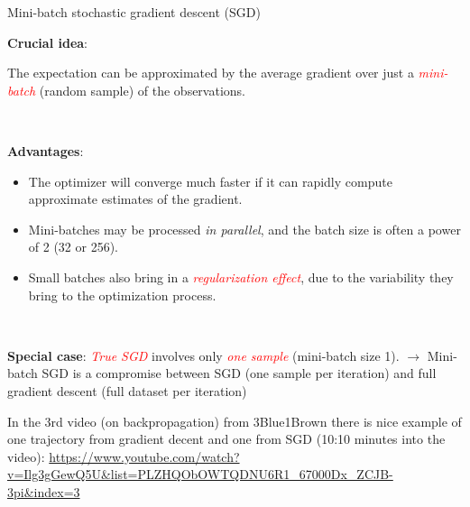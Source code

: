 \documentclass[
  10pt,
  ignorenonframetext,
  twocolumn]{beamer}
\providecommand{\tightlist}{%
  \setlength{\itemsep}{0pt}\setlength{\parskip}{0pt}}
\begin{document}
\begin{frame}
\begin{block}{Mini-batch stochastic gradient descent (SGD)}
\label{mini-batch-stochastic-gradient-descent-sgd}
\(~\)

\textbf{Crucial idea}:

The expectation can be approximated by the average gradient over just a
\emph{\textcolor{red}{mini-batch}} (random sample) of the observations.

\(~\)

\textbf{Advantages}:

\vspace{1mm}

\begin{itemize}
\tightlist
\item
  The optimizer will converge much faster if it can rapidly compute
  approximate estimates of the gradient.
\end{itemize}

\vspace{1mm}

\begin{itemize}
\tightlist
\item
  Mini-batches may be processed \emph{in parallel}, and the batch size
  is often a power of 2 (32 or 256).
\end{itemize}

\vspace{1mm}

\begin{itemize}
\tightlist
\item
  Small batches also bring in a
  \emph{\textcolor{red}{regularization effect}}, due to the variability
  they bring to the optimization process.
\end{itemize}

\(~\)

\textbf{Special case}: \emph{\textcolor{red}{True SGD}} involves only
\emph{\textcolor{red}{one sample}} (mini-batch size 1). \(\rightarrow\)
Mini-batch SGD is a compromise between SGD (one sample per iteration)
and full gradient descent (full dataset per iteration)
\end{block}
\end{frame}

\begin{frame}
In the 3rd video (on backpropagation) from 3Blue1Brown there is nice
example of one trajectory from gradient decent and one from SGD (10:10
minutes into the video):
\url{https://www.youtube.com/watch?v=Ilg3gGewQ5U&list=PLZHQObOWTQDNU6R1_67000Dx_ZCJB-3pi&index=3}
\end{frame}
\end{document}
